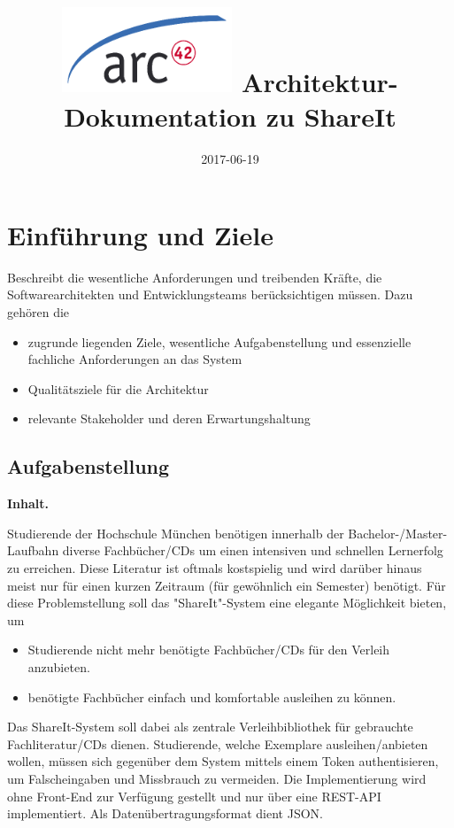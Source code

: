 \documentclass[]{article}
\title{\includegraphics{images/arc42-logo.png} Architektur-Dokumentation zu ShareIt}
\date{2017-06-19}
\begin{document}
\maketitle
\newpage
\section{Einführung und Ziele}\label{section-introduction-and-goals}
Beschreibt die wesentliche Anforderungen und treibenden Kräfte, die
Softwarearchitekten und Entwicklungsteams berücksichtigen müssen. Dazu
gehören die

\begin{itemize}
\item
  zugrunde liegenden Ziele, wesentliche Aufgabenstellung und
  essenzielle fachliche Anforderungen an das System
\item
  Qualitätsziele für die Architektur
\item
  relevante Stakeholder und deren Erwartungshaltung
\end{itemize}

\subsection{Aufgabenstellung}\label{_aufgabenstellung}
\textbf{Inhalt.}

Studierende der Hochschule München benötigen innerhalb der Bachelor-/Master-Laufbahn diverse Fachbücher/CDs um einen intensiven und schnellen Lernerfolg zu erreichen. Diese Literatur ist oftmals kostspielig und wird darüber hinaus meist nur für einen kurzen Zeitraum (für gewöhnlich ein Semester) benötigt. Für diese Problemstellung soll das "ShareIt"-System eine elegante Möglichkeit bieten, um

\begin{itemize}
	\item Studierende nicht mehr benötigte Fachbücher/CDs für den Verleih anzubieten.
	\item benötigte Fachbücher einfach und komfortable ausleihen zu können.
\end{itemize}

Das ShareIt-System soll dabei als zentrale Verleihbibliothek für gebrauchte Fachliteratur/CDs dienen. Studierende, welche Exemplare ausleihen/anbieten wollen, müssen sich gegenüber dem System mittels einem Token authentisieren, um Falscheingaben und Missbrauch zu vermeiden. Die Implementierung wird ohne Front-End zur Verfügung gestellt und nur über eine REST-API implementiert. Als Datenübertragungsformat dient JSON.
\end{document}
